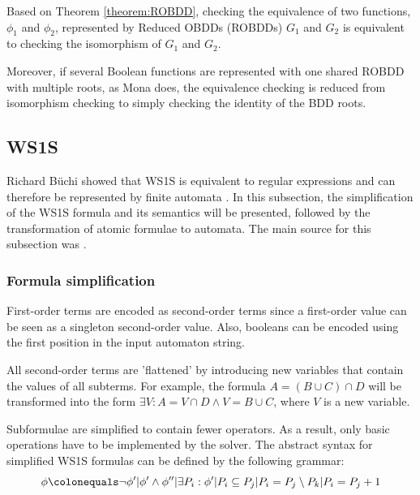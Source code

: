 \documentclass[pdflatex,sn-mathphys-num]{sn-jnl}%
\theoremstyle{thmstyleone}%
\theoremstyle{thmstyletwo}%
\theoremstyle{thmstylethree}%
\begin{document}
        \vspace*{0.5em}

        Based on Theorem \ref{theorem:ROBDD}, checking the equivalence of two functions, $\phi_1$ and $\phi_2$, represented by Reduced OBDDs (ROBDDs) $G_1$ and $G_2$ is equivalent to checking the isomorphism of $G_1$ and $G_2$.

        Moreover, if several Boolean functions are represented with one shared ROBDD with multiple roots, as Mona does, the equivalence checking is reduced from isomorphism checking to simply checking the identity of the BDD roots.


    \subsection{WS1S}
        Richard Büchi showed that WS1S is equivalent to regular expressions and can therefore be represented by finite automata \cite{Buchi}. In this subsection, the simplification of the WS1S formula and its semantics will be presented, followed by the transformation of atomic formulae to automata. The main source for this subsection was \cite{Mona_manual}.

        \subsubsection*{Formula simplification}
            First-order terms are encoded as second-order terms since a first-order value can be seen as a singleton second-order value. Also, booleans can be encoded using the first position in the input automaton string.

            All second-order terms are 'flattened' by introducing new variables that contain the values of all subterms. For example, the formula $A = (B \cup C) \cap D$ will be transformed into the form $\exists V : A = V \cap D \land V = B \cup C$, where $V$ is a new variable.

            Subformulae are simplified to contain fewer operators. As a result, only basic operations have to be implemented by the solver. The abstract syntax for simplified WS1S formulas can be defined by the following grammar:
            $$
                \phi \colonequals \neg \phi' | \phi' \land \phi'' | \exists P_i : \phi' | P_i \subseteq P_j | P_i = P_j \setminus P_k | P_i = P_j + 1
            $$
\end{document}
